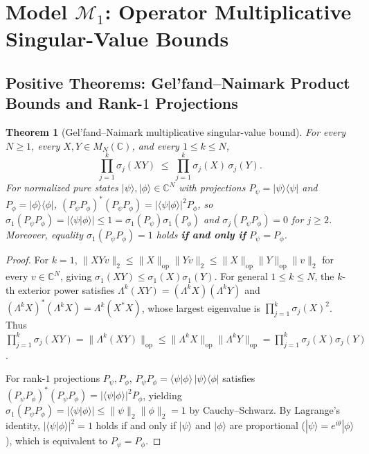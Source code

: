 \documentclass[11pt,a4paper]{article}
\theoremstyle{plain}
\newtheorem{theorem}{Theorem}[section]
\theoremstyle{definition}
\newcommand{\C}{\mathbb{C}}
\newcommand{\op}{\mathrm{op}}
\begin{document}
\section{Model \texorpdfstring{$\mathcal{M}_1$}{M1}: Operator Multiplicative Singular-Value Bounds}

\subsection{Positive Theorems: Gel'fand--Naimark Product Bounds and Rank-\texorpdfstring{$1$}{1} Projections}

\begin{theorem}[Gel'fand--Naimark multiplicative singular-value bound]
\label{thm:gn}
For every $N \ge 1$, every $X, Y \in M_N(\C)$, and every $1 \le k \le N$,
\begin{equation}
\label{eq:gn}
  \prod_{j=1}^k \sigma_j(X Y) \;\le\; \prod_{j=1}^k \sigma_j(X)\,\sigma_j(Y).
\end{equation}
For normalized pure states $|\psi\rangle, |\phi\rangle \in \C^N$ with projections $P_\psi = |\psi\rangle\langle\psi|$ and $P_\phi = |\phi\rangle\langle\phi|$, $(P_\psi P_\phi)^*(P_\psi P_\phi) = |\langle\psi|\phi\rangle|^2 P_\phi$, so $\sigma_1(P_\psi P_\phi) = |\langle\psi|\phi\rangle| \le 1 = \sigma_1(P_\psi)\sigma_1(P_\phi)$ and $\sigma_j(P_\psi P_\phi) = 0$ for $j \ge 2$. Moreover, equality $\sigma_1(P_\psi P_\phi) = 1$ holds \textbf{if and only if} $P_\psi = P_\phi$.
\end{theorem}
\begin{proof}
For $k = 1$, $\|X Y v\|_2 \le \|X\|_{\op} \|Y v\|_2 \le \|X\|_{\op} \|Y\|_{\op} \|v\|_2$ for every $v \in \C^N$, giving $\sigma_1(XY) \le \sigma_1(X)\sigma_1(Y)$. For general $1 \le k \le N$, the $k$-th exterior power satisfies $\Lambda^k(XY) = (\Lambda^k X)(\Lambda^k Y)$ and $(\Lambda^k X)^*(\Lambda^k X) = \Lambda^k(X^* X)$, whose largest eigenvalue is $\prod_{j=1}^k \sigma_j(X)^2$. Thus $\prod_{j=1}^k \sigma_j(XY) = \|\Lambda^k(XY)\|_{\op} \le \|\Lambda^k X\|_{\op} \|\Lambda^k Y\|_{\op} = \prod_{j=1}^k \sigma_j(X)\sigma_j(Y)$.

For rank-$1$ projections $P_\psi, P_\phi$, $P_\psi P_\phi = \langle\psi|\phi\rangle\,|\psi\rangle\langle\phi|$ satisfies $(P_\psi P_\phi)^*(P_\psi P_\phi) = |\langle\psi|\phi\rangle|^2 P_\phi$, yielding $\sigma_1(P_\psi P_\phi) = |\langle\psi|\phi\rangle| \le \|\psi\|_2 \|\phi\|_2 = 1$ by Cauchy--Schwarz. By Lagrange's identity, $|\langle\psi|\phi\rangle|^2 = 1$ holds if and only if $|\psi\rangle$ and $|\phi\rangle$ are proportional ($|\psi\rangle = e^{i\theta}|\phi\rangle$), which is equivalent to $P_\psi = P_\phi$.
\end{proof}
\end{document}
